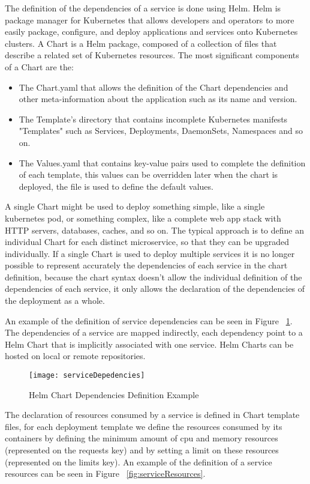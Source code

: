 The definition of the dependencies of a service is done using Helm.
Helm is package manager for Kubernetes that allows developers and operators to more easily package, configure, and deploy applications and services onto Kubernetes clusters.
A Chart is a Helm package, composed of a collection of files that describe a related set of Kubernetes resources.
The most significant components of a Chart are the:
\begin{itemize}
    \item The Chart.yaml that allows the definition of the Chart dependencies and other meta-information about the application such as its name and version.
    \item The Template's directory that contains incomplete Kubernetes manifests "Templates" such as Services, Deployments, DaemonSets, Namespaces and so on.
    \item The Values.yaml that contains key-value pairs used to complete the definition of each template, this values can be overridden later when the chart is deployed, the file is used to define the default values.
\end{itemize}
A single Chart might be used to deploy something simple, like a single kubernetes pod, or something complex, like a complete web app stack with HTTP servers, databases, caches, and so on.
The typical approach is to define an individual Chart for each distinct microservice, so that they can be upgraded individually.
If a single Chart is used to deploy multiple services it is no longer possible to represent accurately the dependencies of each service
in the chart definition, because the chart syntax doesn't allow the individual definition of the dependencies of each service, it only allows the declaration of the dependencies of the deployment as a whole.

An example of the definition of service dependencies can be seen in Figure ~\ref{fig:serviceDepedencies}.
The dependencies of a service are mapped indirectly, each dependency point to a Helm Chart that is implicitly associated with one service.
Helm Charts can be hosted on local or remote repositories.

\begin{figure}[htbp]
    \centering
    \texttt{[image: serviceDepedencies]}
    \caption{Helm Chart Dependencies Definition Example}
    \label{fig:serviceDepedencies}
\end{figure}

\newpage

The declaration of resources consumed by a service is defined in Chart template files,
for each deployment template we define the resources consumed by its containers by
defining the minimum amount of cpu and memory resources (represented on the requests key) and by setting a limit on these resources (represented on the limits key).
An example of the definition of a service resources can be seen in Figure ~\ref{fig:serviceResources}.

